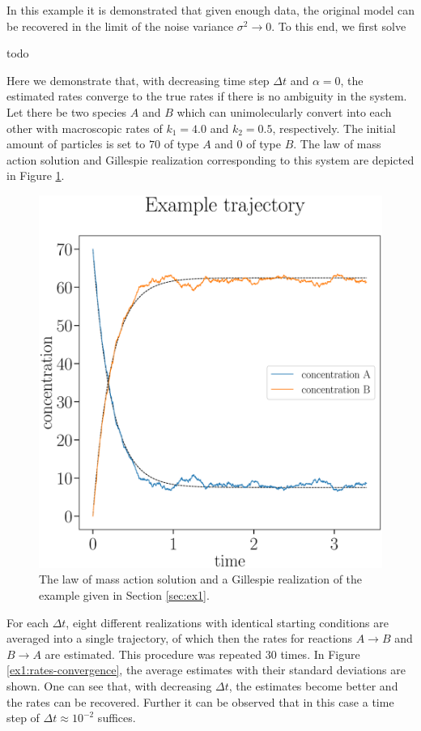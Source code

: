 \documentclass[oneside, abstracton, titlepage]{scrartcl}
\newenvironment{colbox}[1]
{\newcommand\colboxcolor{#1}%
	\begin{lrbox}{\selvestebox}%
		\begin{minipage}{\dimexpr\columnwidth-2\fboxsep\relax}}
		{\end{minipage}\end{lrbox}%
	\begin{center}
		\colorbox[HTML]{\colboxcolor}{\usebox{\selvestebox}}
\end{center}}
\begin{document}
	In this example it is demonstrated that given enough data, the original model can be recovered in the limit of the noise variance $\sigma^2\to 0$. To this end, we first solve 
	
	\begin{colbox}{F8E0E0}
		todo
	\end{colbox}
	
	Here we demonstrate that, with decreasing time step $\Delta t$ and $\alpha=0$, the estimated rates converge to the true rates if there is no ambiguity in the system. Let there be two species $A$ and $B$ which can unimolecularly convert into each other with macroscopic rates of $k_1=4.0$ and $k_2=0.5$, respectively. The initial amount of particles is set to $70$ of type $A$ and $0$ of type $B$. The law of mass action solution and Gillespie realization corresponding to this system are depicted in Figure \ref{ex1:concentration-curves}.

	\begin{figure}
		\begin{center}
			\includegraphics[width=.5\textwidth]{./figures_tex/aux_ex1_concentration_curves}
		\end{center}
		\caption{The law of mass action solution and a Gillespie realization of the example given in Section \ref{sec:ex1}.}
		\label{ex1:concentration-curves}
	\end{figure}

	For each $\Delta t$, eight different realizations with identical starting conditions are averaged into a single trajectory, of which then the rates for reactions $A\to B$ and $B\to A$ are estimated. This procedure was repeated $30$ times. In Figure \ref{ex1:rates-convergence}, the average estimates with their standard deviations are shown. One can see that, with decreasing $\Delta t$, the estimates become better and the rates can be recovered. Further it can be observed that in this case a time step of $\Delta t\approx 10^{-2}$ suffices.
\end{document}
